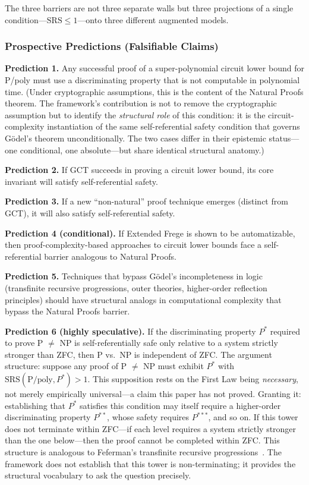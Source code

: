 \documentclass[11pt,a4paper]{article}
\theoremstyle{plain}
\theoremstyle{definition}
\theoremstyle{remark}
\newcommand{\SRS}{\mathrm{SRS}}
\begin{document}
The three barriers are not three separate walls but three projections of a single condition---$\SRS \leq 1$---onto three different augmented models.

\subsubsection{Prospective Predictions (Falsifiable Claims)}

\textbf{Prediction 1.} Any successful proof of a super-polynomial circuit lower bound for P/poly must use a discriminating property that is not computable in polynomial time. (Under cryptographic assumptions, this is the content of the Natural Proofs theorem. The framework's contribution is not to remove the cryptographic assumption but to identify the \emph{structural role} of this condition: it is the circuit-complexity instantiation of the same self-referential safety condition that governs G\"{o}del's theorem unconditionally. The two cases differ in their epistemic status---one conditional, one absolute---but share identical structural anatomy.)

\textbf{Prediction 2.} If GCT succeeds in proving a circuit lower bound, its core invariant will satisfy self-referential safety.

\textbf{Prediction 3.} If a new ``non-natural'' proof technique emerges (distinct from GCT), it will also satisfy self-referential safety.

\textbf{Prediction 4 (conditional).} If Extended Frege is shown to be automatizable, then proof-complexity-based approaches to circuit lower bounds face a self-referential barrier analogous to Natural Proofs.

\textbf{Prediction 5.} Techniques that bypass G\"{o}del's incompleteness in logic (transfinite recursive progressions, outer theories, higher-order reflection principles) should have structural analogs in computational complexity that bypass the Natural Proofs barrier.

\textbf{Prediction 6 (highly speculative).} If the discriminating property $P^*$ required to prove P $\neq$ NP is self-referentially safe only relative to a system strictly stronger than ZFC, then P vs.\ NP is independent of ZFC. The argument structure: suppose any proof of P $\neq$ NP must exhibit $P^*$ with $\SRS(\text{P/poly}, P^*) > 1$. This supposition rests on the First Law being \emph{necessary}, not merely empirically universal---a claim this paper has not proved. Granting it: establishing that $P^*$ satisfies this condition may itself require a higher-order discriminating property $P^{**}$, whose safety requires $P^{***}$, and so on. If this tower does not terminate within ZFC---if each level requires a system strictly stronger than the one below---then the proof cannot be completed within ZFC. This structure is analogous to Feferman's transfinite recursive progressions~\cite{Feferman1962}. The framework does not establish that this tower is non-terminating; it provides the structural vocabulary to ask the question precisely.
\end{document}
